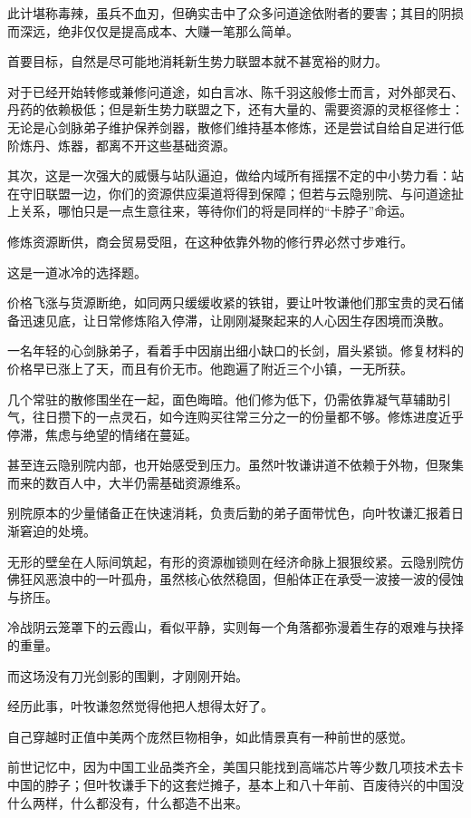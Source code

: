 此计堪称毒辣，虽兵不血刃，但确实击中了众多问道途依附者的要害；其目的阴损而深远，绝非仅仅是提高成本、大赚一笔那么简单。

首要目标，自然是尽可能地消耗新生势力联盟本就不甚宽裕的财力。

对于已经开始转修或兼修问道途，如白言冰、陈千羽这般修士而言，对外部灵石、丹药的依赖极低；但是新生势力联盟之下，还有大量的、需要资源的灵枢径修士：无论是心剑脉弟子维护保养剑器，散修们维持基本修炼，还是尝试自给自足进行低阶炼丹、炼器，都离不开这些基础资源。

其次，这是一次强大的威慑与站队逼迫，做给内域所有摇摆不定的中小势力看：站在守旧联盟一边，你们的资源供应渠道将得到保障；但若与云隐别院、与问道途扯上关系，哪怕只是一点生意往来，等待你们的将是同样的“卡脖子”命运。

修炼资源断供，商会贸易受阻，在这种依靠外物的修行界必然寸步难行。

这是一道冰冷的选择题。

价格飞涨与货源断绝，如同两只缓缓收紧的铁钳，要让叶牧谦他们那宝贵的灵石储备迅速见底，让日常修炼陷入停滞，让刚刚凝聚起来的人心因生存困境而涣散。

一名年轻的心剑脉弟子，看着手中因崩出细小缺口的长剑，眉头紧锁。修复材料的价格早已涨上了天，而且有价无市。他跑遍了附近三个小镇，一无所获。

几个常驻的散修围坐在一起，面色晦暗。他们修为低下，仍需依靠凝气草辅助引气，往日攒下的一点灵石，如今连购买往常三分之一的份量都不够。修炼进度近乎停滞，焦虑与绝望的情绪在蔓延。

甚至连云隐别院内部，也开始感受到压力。虽然叶牧谦讲道不依赖于外物，但聚集而来的数百人中，大半仍需基础资源维系。

别院原本的少量储备正在快速消耗，负责后勤的弟子面带忧色，向叶牧谦汇报着日渐窘迫的处境。

无形的壁垒在人际间筑起，有形的资源枷锁则在经济命脉上狠狠绞紧。云隐别院仿佛狂风恶浪中的一叶孤舟，虽然核心依然稳固，但船体正在承受一波接一波的侵蚀与挤压。

冷战阴云笼罩下的云霞山，看似平静，实则每一个角落都弥漫着生存的艰难与抉择的重量。

而这场没有刀光剑影的围剿，才刚刚开始。

\vspace{2em}

经历此事，叶牧谦忽然觉得他把人想得太好了。

自己穿越时正值中美两个庞然巨物相争，如此情景真有一种前世的感觉。

前世记忆中，因为中国工业品类齐全，美国只能找到高端芯片等少数几项技术去卡中国的脖子；但叶牧谦手下的这套烂摊子，基本上和八十年前、百废待兴的中国没什么两样，什么都没有，什么都造不出来。

